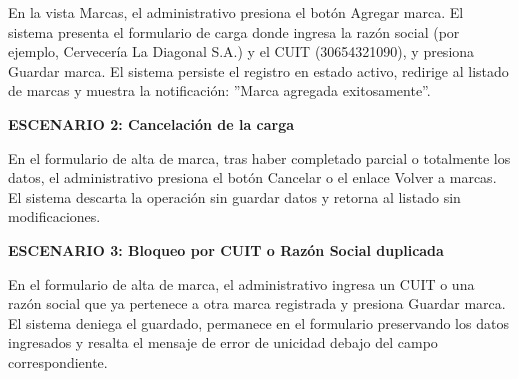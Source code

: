 \documentclass[a4paper,9pt]{article}
\begin{document}
\begin{tcolorbox}[hucard, title={\textbf{HU-253: CONSULTAR MARCAS PROVEEDORAS} \hfill \scriptsize \colorbox{bluestatus}{\textbf{\ New\ }} \quad \colorbox{white}{\textcolor{primarydark}{\textbf{\ 0 pts\ }}}}]
{En la vista Marcas, el administrativo presiona el botón Agregar marca. El sistema presenta el formulario de carga donde ingresa la razón social (por ejemplo, Cervecería La Diagonal S.A.) y el CUIT (30654321090), y presiona Guardar marca. El sistema persiste el registro en estado activo, redirige al listado de marcas y muestra la notificación: ''Marca agregada exitosamente''.\par\vspace{2.5pt}
\noindent\textbf{\textcolor{secondarydark}{ESCENARIO 2:  Cancelación de la carga}}\par\vspace{1pt}
En el formulario de alta de marca, tras haber completado parcial o totalmente los datos, el administrativo presiona el botón Cancelar o el enlace Volver a marcas. El sistema descarta la operación sin guardar datos y retorna al listado sin modificaciones.\par\vspace{2.5pt}
\noindent\textbf{\textcolor{secondarydark}{ESCENARIO 3:  Bloqueo por CUIT o Razón Social duplicada}}\par\vspace{1pt}
En el formulario de alta de marca, el administrativo ingresa un CUIT o una razón social que ya pertenece a otra marca registrada y presiona Guardar marca. El sistema deniega el guardado, permanece en el formulario preservando los datos ingresados y resalta el mensaje de error de unicidad debajo del campo correspondiente.\par\vspace{2.5pt}
}\par
\end{tcolorbox}
\end{document}
